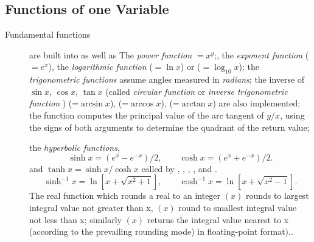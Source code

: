 \documentclass[a4paper,twoside,12pt]{book}
\def\setS#1{#1\label{sec:#1}}
\begin{document}
\subsection{\setS{Functions of one Variable}}
\begin{description}
\item[Fundamental functions] 
are built into \freefempp as well as
%
The \emph{power function} $=x^y$;,
the \emph{exponent function}  ($=e^x$),
the \emph{logarithmic function} ($=\ln x$) or
 ($=\log_{10}x$);
the \emph{trigonometric functions} 
assume angles measured in \emph{radians};
the inverse of $\sin x,\, \cos x,\, \tan x$ (called \emph{circular function} or \emph{inverse trigonometric function} )
(=$\arcsin x$), (=$\arccos x$), (=$\arctan x$) are also implemented;
the  function computes the principal value of the arc tangent of
     $y/x$, using the signs of both arguments to determine the quadrant of the
     return value;

the \emph{hyperbolic functions},
\[
\sinh x=\left( e^x-e^{-x}\right)/2,\qquad
\cosh x=\left( e^x+e^{-x}\right)/2.
\]
and $\tanh x=\sinh x/\cosh x$ called
by , , , ,
 and .
\[
\sinh^{-1}x=\ln \left[x+\sqrt{x^2+1}\right],\qquad
\cosh^{-1}x=\ln \left[x+\sqrt{x^2-1}\right].
\]
The  real function which rounds a real to an integer   $(x)$  rounds to largest integral value not greater than x, $(x)$  round to smallest integral value not less than x; similarly $(x)$
returns the integral value nearest to x (according to
     the prevailing rounding mode) in floating-point format)..


\end{description}
\end{document}

